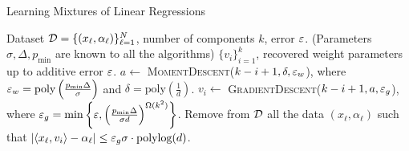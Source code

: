 \begin{algorithm}[!t]
\caption{Learning Mixtures of Linear Regressions\label{alg:mlr}}
\begin{algorithmic}[1]
\REQUIRE Dataset $\mathcal{D} = \{(x_\ell, \alpha_\ell)\}_{\ell =1}^N$, number of components $k$, error $\varepsilon$. (Parameters $\sigma, \Delta, p_{\min}$ are known to all the algorithms)
\ENSURE $\{v_i\}_{i=1}^k$, recovered weight parameters up to additive error $\varepsilon$.
\STATE $a \leftarrow$ \textsc{MomentDescent}($k-i+1, \delta, \varepsilon_w$), where $\varepsilon_w = \text{poly}\left(\frac{p_{\min}\Delta}{\sigma}\right)$ and $\delta=\text{poly}\left(\frac{1}{d}\right)$.
\STATE $v_i \leftarrow$ \textsc{GradientDescent}($ k-i+1, a, \varepsilon_g$), where $\varepsilon_g = \min \left\{\varepsilon, \left(\frac{p_{\min} \Delta}{\sigma d}\right)^{\Omega(k^2)} \right\}$.
\STATE Remove from $\mathcal{D}$ all the data $(x_\ell, \alpha_\ell)$ such that $|\langle x_\ell, v_i \rangle - \alpha_\ell| \le \varepsilon_g  \sigma \cdot \text{polylog}(d)$. 
\ENDFOR
\end{algorithmic}
\end{algorithm}